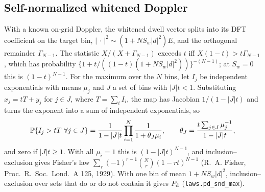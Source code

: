 \subsection{Self-normalized whitened Doppler}
With a known on-grid Doppler, the whitened dwell vector splits into its DFT coefficient on the target bin, $|\,\cdot\,|^2\sim(1+NS_w|d|^2)E$, and the orthogonal remainder $\Gamma_{N-1}$. The statistic $X/(X+\Gamma_{N-1})$ exceeds $t$ iff $X(1-t)>t\Gamma_{N-1}$, which has probability $\{1+t/((1-t)(1+NS_w|d|^2))\}^{-(N-1)}$; at $S_w=0$ this is $(1-t)^{N-1}$. For the maximum over the $N$ bins, let $I_j$ be independent exponentials with means $\mu_j$ and $J$ a set of bins with $|J|t<1$. Substituting $x_j=tT+y_j$ for $j\in J$, where $T=\sum_iI_i$, the map has Jacobian $1/(1-|J|t)$ and turns the exponent into a sum of independent exponentials, so
\[
\mathbb{P}\{I_j>tT\ \forall j\in J\}=\frac{1}{1-|J|t}\prod_{i=1}^N\frac{1}{1+\theta_J\mu_i},\qquad\theta_J=\frac{t\sum_{j\in J}\mu_j^{-1}}{1-|J|t},
\]
and zero if $|J|t\ge1$. With all $\mu_i=1$ this is $(1-|J|t)^{N-1}$, and inclusion–exclusion gives Fisher's law $\sum_r(-1)^{r-1}\binom Nr(1-rt)^{N-1}$ (R.~A. Fisher, Proc.\ R.\ Soc.\ Lond.\ A 125, 1929). With one bin of mean $1+NS_w|d|^2$, inclusion–exclusion over sets that do or do not contain it gives $P_{\rm d}$ (\texttt{laws.pd\_snd\_max}).

